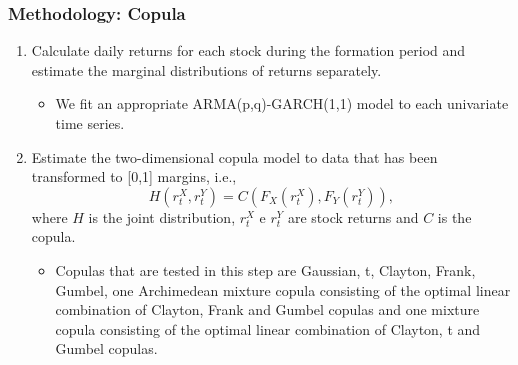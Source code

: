 \documentclass[pdf,9pt,xcolor=dvipsnames,hide notes]{beamer}
\begin{document}
	
\begin{frame}[label=frame4h]
	\frametitle{Methodology: Copula}
	
	\begin{enumerate}[(1)]
		\justifying
		
		\item  Calculate daily returns for each stock during the formation period and estimate the marginal distributions of returns separately.
		\vspace{0.3cm}
		
		\begin{itemize}	
			\item We fit an appropriate ARMA(p,q)-GARCH(1,1) model to each univariate time series.
		\end{itemize}
		
		\vspace{0.3cm}
		
		\item Estimate the two-dimensional copula model to data that has been transformed to [0,1] margins, i.e.,
		\[
		H\left( r_{t}^{X},r_{t}^{Y}\right) =C\left(F_{X}\left( r_{t}^{X}\right)
		,F_{Y}\left( r_{t}^{Y}\right) \right) , 
		\]%
		where $H$ is the joint distribution, $r_{t}^{X}$ e $r_{t}^{Y}$ are stock
		returns and $C$ is the copula.
		
		\vspace{0.3cm}
		
		\begin{itemize}	
			\item Copulas that are tested in this step are Gaussian, t, Clayton, Frank, Gumbel, one Archimedean mixture copula consisting of the optimal linear combination of Clayton, Frank and Gumbel copulas and one mixture copula consisting of the optimal linear combination of Clayton, t and Gumbel copulas.
			
			
		\end{itemize}
		
		\end{enumerate}
	\end{frame}
\end{document}
